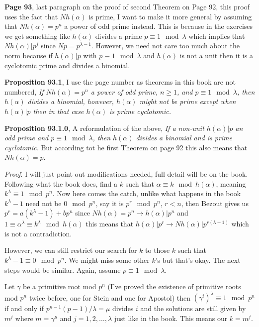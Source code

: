\documentclass[aps,preprint,preprintnumbers,nofootinbib,showpacs,prd]{revtex4-1}
\begin{document}
{\bf Page 93}, last paragraph on the proof of second Theorem on Page 92, this proof uses the fact that $Nh(\alpha)$ is prime, I want to make it more general by assuming that $Nh(\alpha) = p^n$ a power of odd prime instead. This is because in the exercises we get something like $h(\alpha)$ divides a prime $p \equiv 1 \mod{\lambda}$ which implies that $Nh(\alpha) | p^j$ since $N p = p^{\lambda - 1}$. However, we need not care too much about the norm because if $h(\alpha)|p$ with $p \equiv 1 \mod{\lambda}$ and $h(\alpha)$ is not a unit then it is a cyclotomic prime and divides a binomial.

{\bf Proposition 93.1}, I use the page number as theorems in this book are not numbered, {\it If $Nh(\alpha) = p^n$ a power of odd prime, $n \ge 1$, and $p \equiv 1 \mod{\lambda}$, then $h(\alpha)$ divides a binomial, however, $h(\alpha)$ might not be prime except when $h(\alpha)|p$ then in that case $h(\alpha)$ is prime cyclotomic.}

{\bf Proposition 93.1.0}, A reformulation of the above, {\it If a non-unit $h(\alpha) | p$ an odd prime and $p \equiv 1 \mod{\lambda}$, then $h(\alpha)$ divides a binomial and is prime cyclotomic.} But according tot he first Theorem on page 92 this also means that $Nh(\alpha) = p$.

{\it Proof}. I will just point out modifications needed, full detail will be on the book. Following what the book does, find a $k$ such that $\alpha \equiv k \mod{h(\alpha)}$, meaning $k^\lambda \equiv 1 \mod{p^n}$. Now here comes the catch, unlike what happens in the book $k^\lambda - 1$ need not be $0 \mod{p^n}$, say it is $p^r \mod{p^n}$, $r < n$, then Bezout gives us $p^r = a(k^\lambda - 1) + bp^n$ since $Nh(\alpha) = p^n \to h(\alpha) | p^n$ and $1 \equiv \alpha^\lambda \equiv k^\lambda \mod{h(\alpha)}$ this means that $h(\alpha) | p^r \to Nh(\alpha) | p^{r(\lambda-1)}$ which is not a contradiction.

However, we can still restrict our search for $k$ to those $k$ such that $k^\lambda - 1 \equiv 0 \mod{p^n}$. We might miss some other $k$'s but that's okay. The next steps would be similar. Again, assume $p \equiv 1 \mod{\lambda}$.

Let $\gamma$ be a primitive root mod $p^n$ (I've proved the existence of primitive roots mod $p^n$ twice before, one for Stein and one for Apostol) then $(\gamma^i)^\lambda \equiv 1 \mod{p^n}$ if and only if $p^{n-1}(p - 1)/\lambda = \mu$ divides $i$ and the solutions are still given by $m^j$ where $m = \gamma^\mu$ and $j = 1,2,\dots,\lambda$ just like in the book. This means our $k = m^j$.
\end{document}
